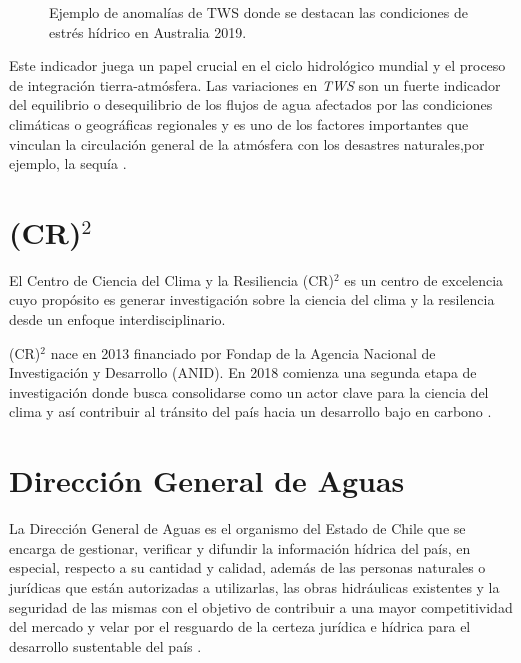 \begin{figure}[H]
    \centering
          \goodgap
          \vskip -0.1in
    \caption[Ejemplo de anomalías de TWS]{\footnotesize Ejemplo de anomalías de TWS donde se destacan las condiciones de estrés hídrico en Australia 2019.}
    \label{logo1}
\end{figure}
Este indicador juega un  papel crucial en el ciclo hidrológico mundial y el proceso de integración tierra-atmósfera. Las variaciones en \textit{TWS} son
un fuerte indicador del equilibrio o desequilibrio de los flujos de agua afectados por las condiciones climáticas o geográficas
regionales y es uno de los factores importantes que vinculan la circulación general de la atmósfera con los desastres naturales,por ejemplo, la sequía \cite{15}.
%
%
%
%
\section{(CR)$^2$}
El Centro de Ciencia del Clima y la Resiliencia (CR)$^2$ es un centro de excelencia cuyo propósito es generar investigación
sobre la ciencia del clima y la resilencia desde un enfoque interdisciplinario. 

(CR)$^2$ nace en 2013 financiado por Fondap de la Agencia Nacional de Investigación y Desarrollo (ANID). En 2018 comienza una segunda etapa
de investigación donde busca consolidarse como un actor clave para la ciencia del clima y así contribuir al tránsito del país hacia un desarrollo 
bajo en carbono \cite{cr2}.

%
%
%
%
\section{Dirección General de Aguas}
La Dirección General de Aguas es el organismo del Estado de Chile que se encarga de gestionar, verificar y difundir la información 
hídrica del país, en especial, respecto a su cantidad y calidad, además de las personas naturales o jurídicas que están autorizadas a utilizarlas,
las obras hidráulicas existentes y la seguridad de las mismas con el objetivo de contribuir a una mayor competitividad 
del mercado y velar por el resguardo de la certeza jurídica e hídrica para el desarrollo sustentable del país \cite{dga}.

